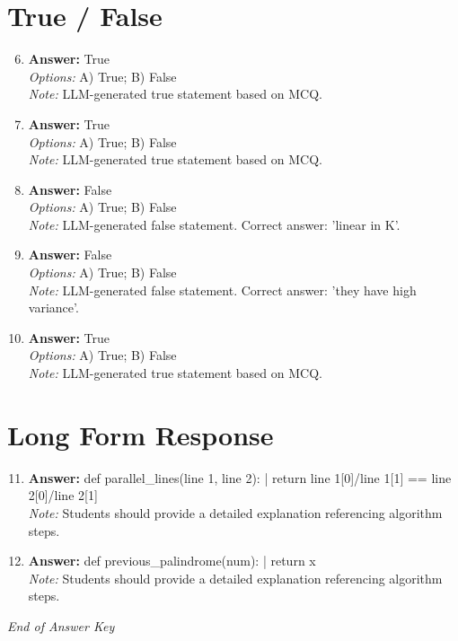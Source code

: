 \documentclass[12pt]{article}
\begin{document}
\section*{True / False}
\begin{enumerate}[label=\arabic*.]
\setcounter{enumi}{5}
\item \textbf{Answer:} True
\\ \textit{Options:} A) True; B) False
\\ \textit{Note:} LLM-generated true statement based on MCQ.
\item \textbf{Answer:} True
\\ \textit{Options:} A) True; B) False
\\ \textit{Note:} LLM-generated true statement based on MCQ.
\item \textbf{Answer:} False
\\ \textit{Options:} A) True; B) False
\\ \textit{Note:} LLM-generated false statement. Correct answer: 'linear in K'.
\item \textbf{Answer:} False
\\ \textit{Options:} A) True; B) False
\\ \textit{Note:} LLM-generated false statement. Correct answer: 'they have high variance'.
\item \textbf{Answer:} True
\\ \textit{Options:} A) True; B) False
\\ \textit{Note:} LLM-generated true statement based on MCQ.
\end{enumerate}

\section*{Long Form Response}
\begin{enumerate}[label=\arabic*.]
\setcounter{enumi}{10}
\item \textbf{Answer:} def parallel\_lines(line 1, line 2): | return line 1[0]/line 1[1] == line 2[0]/line 2[1]
\\ \textit{Note:} Students should provide a detailed explanation referencing algorithm steps.
\item \textbf{Answer:} def previous\_palindrome(num): | return x
\\ \textit{Note:} Students should provide a detailed explanation referencing algorithm steps.
\end{enumerate}

\vfill
\noindent\textit{End of Answer Key}
\end{document}

